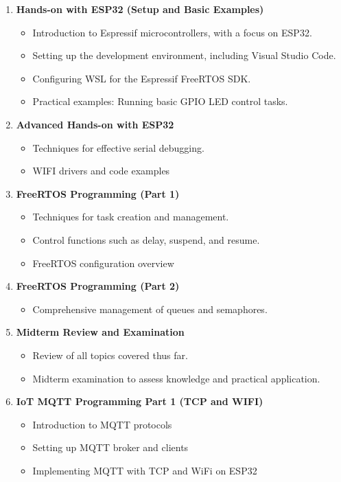 \begin{enumerate}[label=\textbf{Week \arabic*:}]
    \item \textbf{Hands-on with ESP32 (Setup and Basic Examples)}
    \begin{itemize}
        \item Introduction to Espressif microcontrollers, with a focus on ESP32.
        \item Setting up the development environment, including Visual Studio Code.
        \item Configuring WSL for the Espressif FreeRTOS SDK.
        \item Practical examples: Running basic GPIO LED control tasks.
    \end{itemize}

    \item \textbf{Advanced Hands-on with ESP32}
    \begin{itemize}
        \item Techniques for effective serial debugging.
        \item WIFI drivers and code examples
    \end{itemize}

    \item \textbf{FreeRTOS Programming (Part 1)}
    \begin{itemize}
        \item Techniques for task creation and management.
        \item Control functions such as delay, suspend, and resume.
        \item FreeRTOS configuration overview
    \end{itemize}

    \item \textbf{FreeRTOS Programming (Part 2)}
    \begin{itemize}
        \item Comprehensive management of queues and semaphores.
    \end{itemize}

    \item \textbf{Midterm Review and Examination}
    \begin{itemize}
        \item Review of all topics covered thus far.
        \item Midterm examination to assess knowledge and practical application.
    \end{itemize}

    \item \textbf{IoT MQTT Programming Part 1 (TCP and WIFI)}
    \begin{itemize}
        \item Introduction to MQTT protocols
        \item Setting up MQTT broker and clients
        \item Implementing MQTT with TCP and WiFi on ESP32
    \end{itemize}


\end{enumerate}
